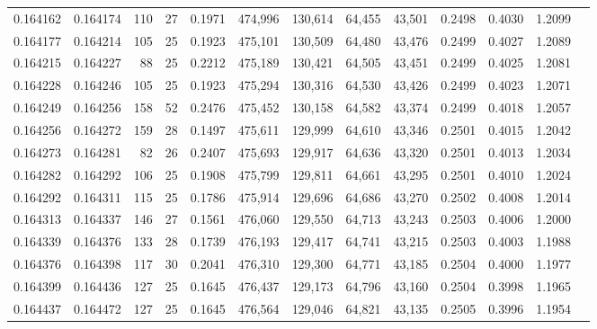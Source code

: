 \begin{tabular}{rrrrrrrrrrrrr}
0.164162 & 0.164174 &   110 &  27 &                                     0.1971 & 474,996 & 130,614 &  64,455 &  43,501 & 0.2498 & 0.4030 & 1.2099 \\
0.164177 & 0.164214 &   105 &  25 &                                     0.1923 & 475,101 & 130,509 &  64,480 &  43,476 & 0.2499 & 0.4027 & 1.2089 \\
0.164215 & 0.164227 &    88 &  25 &                                     0.2212 & 475,189 & 130,421 &  64,505 &  43,451 & 0.2499 & 0.4025 & 1.2081 \\
0.164228 & 0.164246 &   105 &  25 &                                     0.1923 & 475,294 & 130,316 &  64,530 &  43,426 & 0.2499 & 0.4023 & 1.2071 \\
0.164249 & 0.164256 &   158 &  52 &                                     0.2476 & 475,452 & 130,158 &  64,582 &  43,374 & 0.2499 & 0.4018 & 1.2057 \\
0.164256 & 0.164272 &   159 &  28 &                                     0.1497 & 475,611 & 129,999 &  64,610 &  43,346 & 0.2501 & 0.4015 & 1.2042 \\
0.164273 & 0.164281 &    82 &  26 &                                     0.2407 & 475,693 & 129,917 &  64,636 &  43,320 & 0.2501 & 0.4013 & 1.2034 \\
0.164282 & 0.164292 &   106 &  25 &                                     0.1908 & 475,799 & 129,811 &  64,661 &  43,295 & 0.2501 & 0.4010 & 1.2024 \\
0.164292 & 0.164311 &   115 &  25 &                                     0.1786 & 475,914 & 129,696 &  64,686 &  43,270 & 0.2502 & 0.4008 & 1.2014 \\
0.164313 & 0.164337 &   146 &  27 &                                     0.1561 & 476,060 & 129,550 &  64,713 &  43,243 & 0.2503 & 0.4006 & 1.2000 \\
0.164339 & 0.164376 &   133 &  28 &                                     0.1739 & 476,193 & 129,417 &  64,741 &  43,215 & 0.2503 & 0.4003 & 1.1988 \\
0.164376 & 0.164398 &   117 &  30 &                                     0.2041 & 476,310 & 129,300 &  64,771 &  43,185 & 0.2504 & 0.4000 & 1.1977 \\
0.164399 & 0.164436 &   127 &  25 &                                     0.1645 & 476,437 & 129,173 &  64,796 &  43,160 & 0.2504 & 0.3998 & 1.1965 \\
0.164437 & 0.164472 &   127 &  25 &                                     0.1645 & 476,564 & 129,046 &  64,821 &  43,135 & 0.2505 & 0.3996 & 1.1954 \\

\end{tabular}
